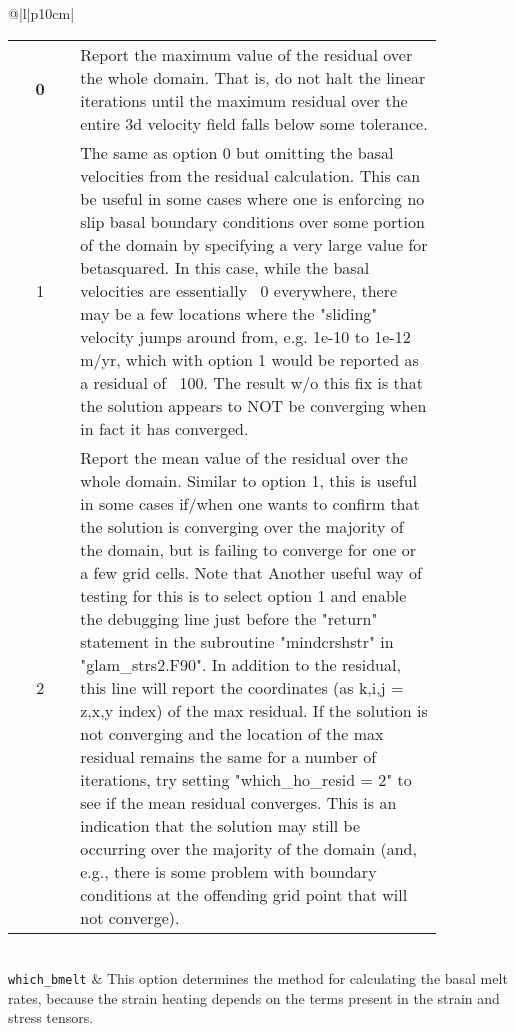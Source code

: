 \begin{center}
\begin{supertabular*}{\textwidth}{@{\extracolsep{\fill}}|l|p{10cm}|}
    \begin{tabular}[t]{cp{0.85\linewidth}}
      {\bf 0} & Report the maximum value of the residual over the whole domain.
          That is, do not halt the linear iterations until the maximum residual
          over the entire 3d velocity field falls below some tolerance.\\
      1 & The same as option 0 but omitting the basal velocities from the
          residual calculation. This can be useful in some cases where one is
          enforcing no slip basal boundary conditions over some portion of the
          domain by specifying a very large value for betasquared. In this case,
          while the basal velocities are essentially ~0 everywhere, there may be
          a few locations where the "sliding" velocity jumps around from, e.g.
          1e-10 to 1e-12 m/yr, which with option 1 would be reported as a
          residual of ~100. The result w/o this fix is that the solution appears
          to NOT be converging when in fact it has converged.\\
      2 & Report the mean value of the residual over the whole domain.
          Similar to option 1, this is useful in some cases if/when one wants to
          confirm that the solution is converging over the majority of the
          domain, but is failing to converge for one or a few grid cells. Note
          that Another useful way of testing for this is to select option 1 and
          enable the debugging line just before the "return" statement in the
          subroutine "mindcrshstr" in "glam\_strs2.F90". In addition to the
          residual, this line will report the coordinates (as k,i,j = z,x,y
          index) of the max residual. If the solution is not converging and the
          location of the max residual remains the same for a number of
          iterations, try setting "which\_ho\_resid = 2" to see if the mean
          residual converges. This is an indication that the solution may still
          be occurring over the majority of the domain (and, e.g., there is some
          problem with boundary conditions at the offending grid point that will
          not converge).\\
    \end{tabular}\\  
    \hline
    \texttt{which\_bmelt} & 
    This option determines the method for calculating the basal melt rates,
    because the strain heating depends on the terms present in the strain and
    stress tensors.
    \begin{tabular}[t]{cp{0.85\linewidth}}

\end{tabular}
\end{supertabular*}
\end{center}
